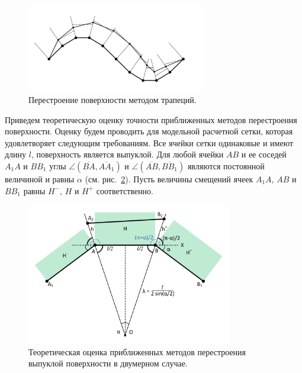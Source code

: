 \begin{figure}[h]
\onelinecaptionstrue
\centering
\includegraphics[width=0.7\textwidth]{pics/text_1_remesh_2d/grid_trapeziums.pdf}
\caption{Перестроение поверхности методом трапеций.}
\label{fig:text_1_remesh_2d_grid_trapeziums}
\end{figure}

Приведем теоретическую оценку точности приближенных методов перестроения поверхности.
Оценку будем проводить для модельной расчетной сетки, которая удовлетворяет следующим требованиям.
Все ячейки сетки одинаковые и имеют длину $l$, поверхность является выпуклой.
Для любой ячейки $AB$ и ее соседей $A_1A$ и $BB_1$ углы $\angle (\overline{BA}, \overline{AA_1})$ и $\angle (\overline{AB}, \overline{BB_1})$ являются постоянной величиной и равны $\alpha$ (см. рис.~\ref{fig:text_1_remesh_2d_theoretical}).
Пусть величины смещений ячеек $A_1A$, $AB$ и $BB_1$ равны $H^{-}$, $H$ и $H^{+}$ соответственно.

\begin{figure}[h]
\onelinecaptionstrue
\centering
\includegraphics[width=0.8\textwidth]{pics/text_1_remesh_2d/theoretical.pdf}
\caption{Теоретическая оценка приближенных методов перестроения выпуклой поверхности в двумерном случае.}
\label{fig:text_1_remesh_2d_theoretical}
\end{figure}

